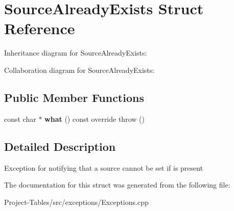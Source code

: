 \hypertarget{structSourceAlreadyExists}{}\section{Source\+Already\+Exists Struct Reference}
\label{structSourceAlreadyExists}


Inheritance diagram for Source\+Already\+Exists\+:


Collaboration diagram for Source\+Already\+Exists\+:
\subsection*{Public Member Functions}
\begin{DoxyCompactItemize}
\item 
\mbox{\label{structSourceAlreadyExists_ab23b9ca1c0f3c63571733f9b08508dd5}} 
const char $\ast$ {\bfseries what} () const override  throw ()
\end{DoxyCompactItemize}


\subsection{Detailed Description}
Exception for notifying that a source cannot be set if is present 

The documentation for this struct was generated from the following file\+:\begin{DoxyCompactItemize}
\item 
Project-\/\+Tables/src/exceptions/Exceptions.\+cpp\end{DoxyCompactItemize}
